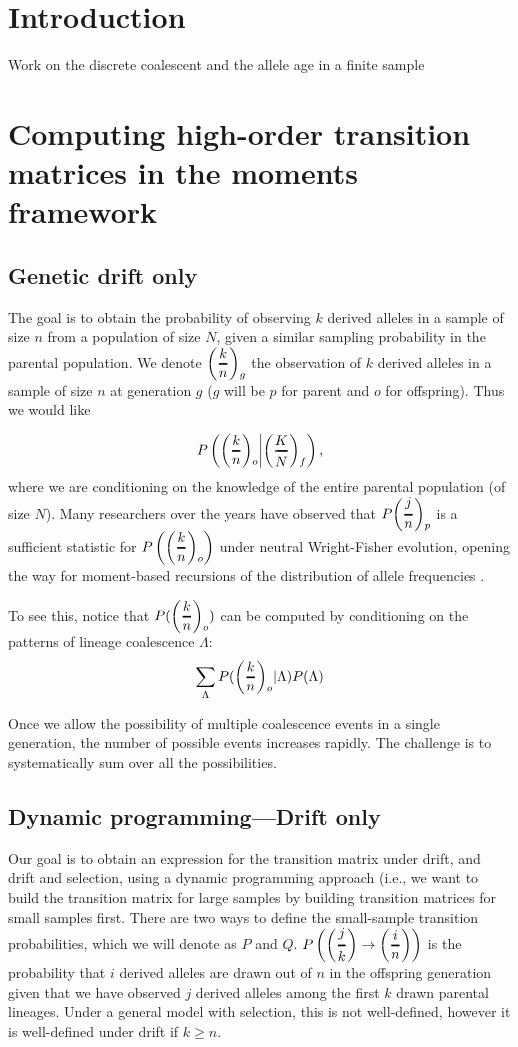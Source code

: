 \documentclass[]{article}
\newcommand{\Dfrac}[2]{%
  \ooalign{%
    $\left(\genfrac{}{}{1.2pt}0{#1}{#2}\right)$\cr%
    $\color{white}\genfrac{}{}{.4pt}0{\phantom{#1}}{\phantom{#2}}$}%
}
\begin{document}
\section{Introduction}
\label{sec:intro}

Work on the discrete coalescent and the allele age in a finite sample
\section{Computing high-order transition matrices in the moments framework}
\subsection{Genetic drift only}
The goal is to obtain the probability of observing $k$ derived alleles in a sample of size $n$ from a population of size $N$, given a similar sampling probability in the parental population. We denote $\Dfrac{k}{n}_g$ the observation of $k$ derived alleles in a sample of size $n$ at generation $g$ ($g$ will be $p$ for parent and $o$ for offspring).  Thus we would like 

$$P\left(\Dfrac{k}{n}_o \middle|  \Dfrac{K}{N}_f \right),$$ where we are conditioning on the knowledge of the entire parental population (of size $N$). Many researchers over the years have observed that $P\Dfrac{j}{n}_p$ is a sufficient statistic for  $P\left(\Dfrac{k}{n}_o\right)$ under neutral Wright-Fisher evolution, opening the way for moment-based recursions of the distribution of allele frequencies \cite{Kimura, Ewens, Song, Jouganous, Kurtz-Donnely}.

To see this, notice that $P(\Dfrac{k}{n}_o)$ can be computed by conditioning on the patterns of lineage coalescence $\Lambda$:
$$\sum_\Lambda P(\Dfrac{k}{n}_o | \Lambda) P(\Lambda)$$


 

Once we allow the possibility of multiple coalescence events in a single generation, the number of possible events increases rapidly. The challenge is to systematically sum over all the possibilities. 

\subsection{Dynamic programming---Drift only}
Our goal is to obtain an expression for the transition matrix under drift, and drift and selection, using a dynamic programming approach (i.e., we want to build the transition matrix for large samples by building transition matrices for small samples first. There are two ways to define the small-sample transition probabilities, which we will denote as $P$ and $Q$. $P\left(\Dfrac{j}{k} \rightarrow \Dfrac{i}{n} \right)$ is the probability that $i$ derived alleles are drawn out of $n$ in the offspring generation given that we have observed $j$ derived alleles among the first $k$ drawn parental lineages. Under a general model with selection, this is not well-defined, however it is well-defined under drift if $k\geq n$. 
\end{document}
